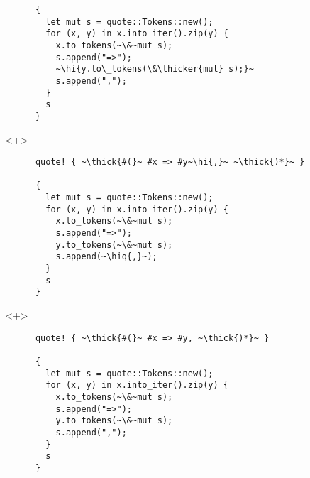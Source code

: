 \documentclass[usepdftitle=false]{beamer}
\renewcommand{\&}{\makebox[\widthof{\ampersand}][c]{\scalebox{0.9}[1.0]{\Book\ampersand}}}
\newcommand{\+}{\makebox[\widthof{+}][c]{\raisebox{-.2\height}{\scalefont{1.5}\Light+}}}
\newcommand{\thick}[1]{\contourlength{0.12pt}\contour[10]{black}{#1}}
\newcommand{\thicker}[1]{\contourlength{0.26pt}\contour[10]{black}{#1}}
\newcommand{\hi}[1]{%
\tikz[baseline=(A.base)]
 \node[highlighting=0,inner sep=0pt,text depth=0pt] (A) {#1};%
}
\newcommand{\hiq}[1]{\hi{''#1''}}
\begin{document}
\begin{frame}[fragile]
\begin{onlyenv}
\begin{verbatim}
      {
        let mut s = quote::Tokens::new();
        for (x, y) in x.into_iter().zip(y) {
          x.to_tokens(~\&~mut s);
          s.append("=>");
          ~\hi{y.to\_tokens(\&\thicker{mut} s);}~
          s.append(",");
        }
        s
      }
    \end{verbatim}
  \end{onlyenv}
  \begin{onlyenv}<+>
    \begin{verbatim}
      quote! { ~\thick{#(}~ #x => #y~\hi{,}~ ~\thick{)*}~ }

      {
        let mut s = quote::Tokens::new();
        for (x, y) in x.into_iter().zip(y) {
          x.to_tokens(~\&~mut s);
          s.append("=>");
          y.to_tokens(~\&~mut s);
          s.append(~\hiq{,}~);
        }
        s
      }
    \end{verbatim}
  \end{onlyenv}
  \begin{onlyenv}<+>
    \begin{verbatim}
      quote! { ~\thick{#(}~ #x => #y, ~\thick{)*}~ }

      {
        let mut s = quote::Tokens::new();
        for (x, y) in x.into_iter().zip(y) {
          x.to_tokens(~\&~mut s);
          s.append("=>");
          y.to_tokens(~\&~mut s);
          s.append(",");
        }
        s
      }
    \end{verbatim}
  \end{onlyenv}
\end{frame}


\end{document}

